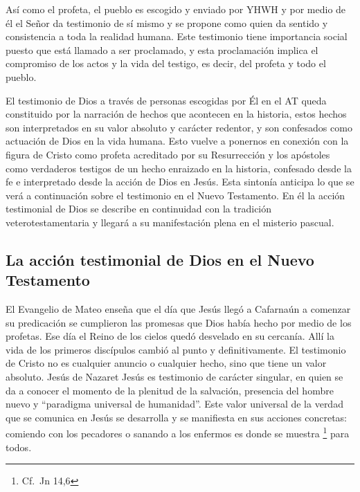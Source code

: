 Así como el profeta, el pueblo es escogido y enviado por YHWH y por medio de él
el Señor da testimonio de sí mismo y se propone como quien da sentido y
consistencia a toda la realidad humana. Este testimonio tiene importancia social
puesto que está llamado a ser proclamado, y esta proclamación implica el
compromiso de los actos y la vida del testigo, es decir, del profeta y todo el
pueblo.\autocite[Cf.][1526s]{latourelle2000testimonio}

El testimonio de Dios a través de personas escogidas por Él en el AT queda
constituido por la narración de hechos que acontecen en la historia, estos
hechos son interpretados en su valor absoluto y carácter redentor, y son
confesados como actuación de Dios en la vida
humana.\autocite[Cf.][119]{prades2015testimonio} Esto vuelve a ponernos en
conexión con la figura de Cristo como profeta acreditado por su Resurrección y
los apóstoles como verdaderos testigos de un hecho enraizado en la historia,
confesado desde la fe e interpretado desde la acción de Dios en Jesús. Esta
sintonía anticipa lo que se verá a continuación sobre el testimonio en el Nuevo
Testamento. En él la acción testimonial de Dios se describe en continuidad con
la tradición veterotestamentaria y llegará a su manifestación plena en el
misterio pascual.

\subsection{La acción testimonial de Dios en el Nuevo Testamento}
El Evangelio de Mateo enseña que el día que Jesús llegó a Cafarnaún a comenzar
su predicación se cumplieron las promesas que Dios había hecho por medio de los
profetas. Ese día el Reino de los cielos quedó desvelado en su cercanía. Allí la
vida de los primeros discípulos cambió al punto y definitivamente. El testimonio
de Cristo no es cualquier anuncio o cualquier hecho, sino que tiene un valor
absoluto. Jesús de Nazaret \autocite[126]{prades2015testimonio} Jesús es
testimonio de carácter singular,\autocite[Cf.][279]{ninot2009tf} en quien se da
a conocer el momento de la plenitud de la
salvación,\autocite[Cf.][290]{ninot2009tf} presencia del hombre nuevo y
``paradigma universal de humanidad''\autocite[Cf.][291]{ninot2009tf}. Este valor
universal de la verdad que se comunica en Jesús se desarrolla y se manifiesta en
sus acciones concretas: comiendo con los pecadores o sanando a los enfermos es
donde se muestra \footnote{Cf.~Jn 14,6} para todos.

